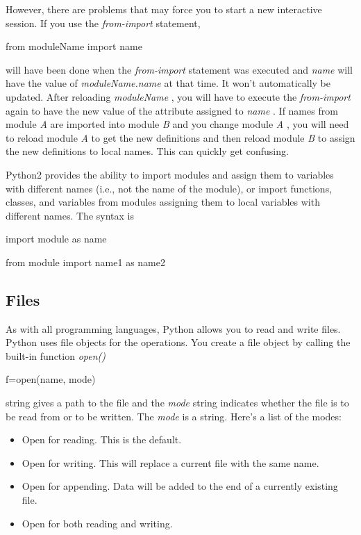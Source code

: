 However, there are problems that
may force you to start a new interactive session. If you use the
\emph{from-import} statement,

from moduleName import name


will have been done when the \emph{from-import} statement was executed
and \emph{name} will have the value of \emph{moduleName.name} at that
time. It won't automatically be updated. After reloading
\emph{moduleName} , you will have to execute the \emph{from-import}
again to have the new value of the attribute assigned to \emph{name} .
If names from module \emph{A} are imported into module \emph{B} and you
change module \emph{A} , you will need to reload module \emph{A} to get
the new definitions and then reload module \emph{B} to assign the new
definitions to local names. This can quickly get confusing.

Python2 provides the ability to
import modules and assign them to variables with different names (i.e.,
not the name of the module), or import functions, classes, and variables
from modules assigning them to local variables with different names. The
syntax is

import module as name

from module import name1 as name2

\subsection{Files}

As with all programming languages,
Python allows you to read and write files. Python uses file objects for
the operations. You create a file object by calling the built-in
function \emph{open()}

f=open(name, mode)

 string gives
a path to the file and the \emph{mode} string indicates whether the file
is to be read from or to be written. The \emph{mode} is a string. Here's
a list of the modes:

\begin{itemize}
\tightlist
\item
   Open for reading.
  This is the default.
\item
   Open for writing.
  This will replace a current file with the same name.
\item
   Open for appending.
  Data will be added to the end of a currently existing file.
\item
   Open for both
  reading and writing.
\end{itemize}


